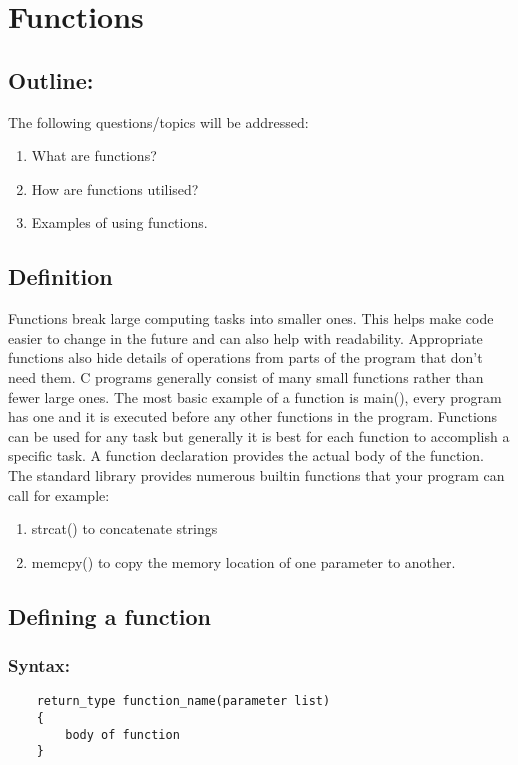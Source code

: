 \documentclass[12pt, letterpaper]{report}
\begin{document}
\chapter{Functions}
\section{Outline:}
	The following questions/topics will be addressed:
	\begin{enumerate}
		\item What are functions?
		\item How are functions utilised?
		\item Examples of using functions.
	\end{enumerate}

\section{Definition}
Functions break large computing tasks into smaller ones. This helps make code 
easier to change in the future and can also help  with readability. Appropriate 
functions also hide details of operations from parts of the program that don't 
need them. C programs generally consist of many small functions rather than fewer 
large ones. The most basic example of a function is main(), every program has one 
and it is executed before any other functions in the program. Functions can be 
used for any task but generally it is best for each function to accomplish a 
specific task. A function declaration provides the actual body of the function. \\

The standard library provides numerous builtin functions that your program can call
for example:
\begin{enumerate}
	\item strcat() to concatenate strings
	\item memcpy() to copy the memory location of one parameter to another.
\end{enumerate}

\clearpage
\section{Defining a function}

\subsection*{Syntax:}
\begin{lstlisting}
	return_type function_name(parameter list)
	{
		body of function
	}
\end{lstlisting}
\end{document}
